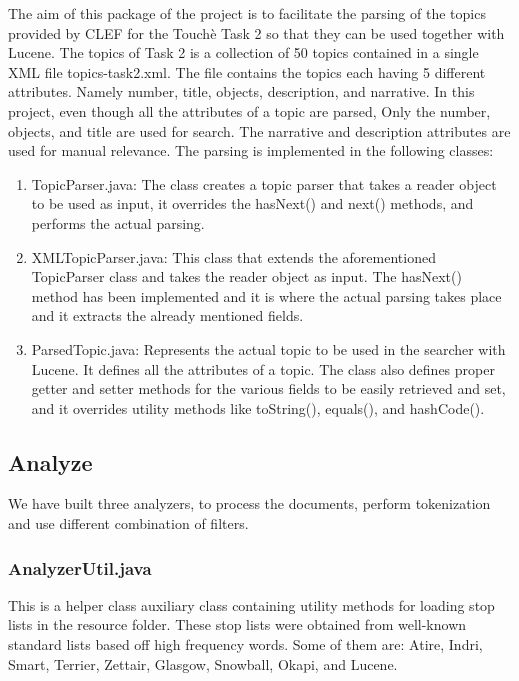             The aim of this package of the project is to facilitate the parsing of the topics provided by CLEF for the Touchè Task 2 so that they can be used together with Lucene. The topics of Task 2 is a collection of 50 topics contained in a single XML file topics-task2.xml. The file contains the topics each having 5 different attributes. Namely number, title, objects, description, and narrative. In this project, even though all the attributes of a topic are parsed, Only the number, objects, and title are used for search. The narrative and description attributes are used for manual relevance. The parsing is implemented in the following classes:
            \begin{enumerate}
                \item 
                    TopicParser.java: The class creates a topic parser that takes a reader object to be used as input, it overrides the hasNext() and next() methods, and performs the actual parsing.
                \item 
                    XMLTopicParser.java: This class that extends the aforementioned TopicParser class and takes the reader object as input. The hasNext() method has been implemented and it is where the actual parsing takes place and it extracts the already mentioned fields.
                \item
                    ParsedTopic.java: Represents the actual topic to be used in the searcher with Lucene. It defines all the attributes of a topic. The class also defines proper getter and setter methods for the various fields to be easily retrieved and set, and it overrides utility methods like toString(), equals(), and hashCode().
            \end{enumerate}
\subsection{Analyze}
\label{subsec:analyze}
  
    We have built three analyzers, to process the documents, perform tokenization and use different combination of filters.
\subsubsection{AnalyzerUtil.java}
            
            This is a helper class auxiliary class containing utility methods for loading stop lists in the resource folder. These stop lists were obtained from well-known standard lists based off high frequency words. Some of them are: Atire, Indri, Smart, Terrier, Zettair, Glasgow, Snowball, Okapi, and Lucene. 
